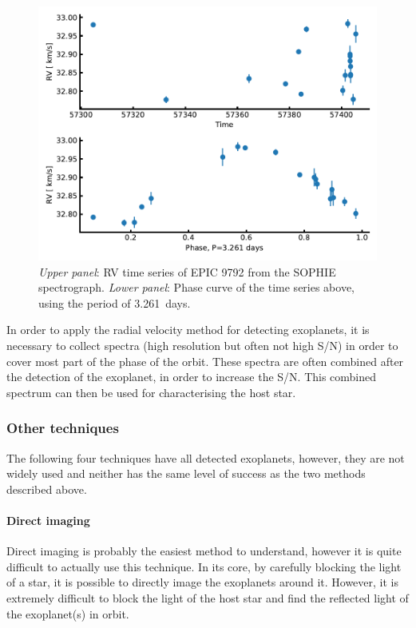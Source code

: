 \begin{figure}[htpb!]
    \centering
    \includegraphics[width=1.0\linewidth]{figures/RVmethod.pdf}
    \caption{\emph{Upper panel}: RV time series of EPIC 9792 from the SOPHIE spectrograph.
             \emph{Lower panel}: Phase curve of the time series above, using the period of
             \SI{3.261}{days}.}
    \label{fig:rvmethod}
\end{figure}

In order to apply the radial velocity method for detecting exoplanets, it is necessary to collect
spectra (high resolution but often not high S/N) in order to cover most part of the phase of the
orbit. These spectra are often combined after the detection of the exoplanet, in order to increase
the S/N. This combined spectrum can then be used for characterising the host star.


\subsubsection{Other techniques}

The following four techniques have all detected exoplanets, however, they are not widely used and
neither has the same level of success as the two methods described above.

\paragraph{Direct imaging}

Direct imaging is probably the easiest method to understand, however it is quite difficult to
actually use this technique. In its core, by carefully blocking the light of a star, it is possible
to directly image the exoplanets around it. However, it is extremely difficult to block the light
of the host star and find the reflected light of the exoplanet(s) in orbit.

